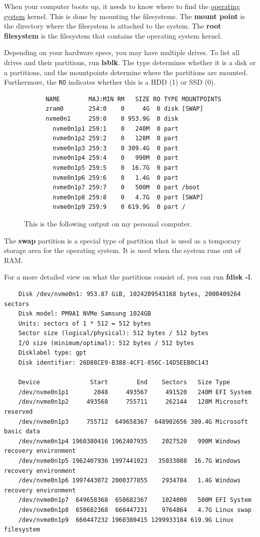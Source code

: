 \documentclass{article}
\begin{document}
  When your computer boots up, it needs to know where to find the \hyperref[def:operating-system]{operating system} kernel. This is done by mounting the filesystems. The \textbf{mount point} is the directory where the filesystem is attached to the system. The \textbf{root filesystem} is the filesystem that contains the operating system kernel.

  Depending on your hardware specs, you may have multiple drives. To list all drives and their partitions, run \textbf{lsblk}. The type determines whether it is a disk or a partitions, and the mountpoints determine where the partitions are mounted. Furthermore, the \texttt{RO} indicates whether this is a HDD (1) or SSD (0). 

  \begin{figure}[hbt!]
    \centering 
    \begin{lstlisting} 
      NAME        MAJ:MIN RM   SIZE RO TYPE MOUNTPOINTS
      zram0       254:0    0     4G  0 disk [SWAP]
      nvme0n1     259:0    0 953.9G  0 disk 
        nvme0n1p1 259:1    0   240M  0 part 
        nvme0n1p2 259:2    0   128M  0 part 
        nvme0n1p3 259:3    0 309.4G  0 part 
        nvme0n1p4 259:4    0   990M  0 part 
        nvme0n1p5 259:5    0  16.7G  0 part 
        nvme0n1p6 259:6    0   1.4G  0 part 
        nvme0n1p7 259:7    0   500M  0 part /boot
        nvme0n1p8 259:8    0   4.7G  0 part [SWAP]
        nvme0n1p9 259:9    0 619.9G  0 part /
    \end{lstlisting}
    \caption{This is the following output on my personal computer. } 
    \label{fig:lsblk}
  \end{figure}
    
  The \textbf{swap} partition is a special type of partition that is used as a temporary storage area for the operating system. It is used when the system runs out of RAM. 

  For a more detailed view on what the partitions consist of, you can run \textbf{fdisk -l}.
  \begin{lstlisting} 
    Disk /dev/nvme0n1: 953.87 GiB, 1024209543168 bytes, 2000409264 sectors
    Disk model: PM9A1 NVMe Samsung 1024GB               
    Units: sectors of 1 * 512 = 512 bytes
    Sector size (logical/physical): 512 bytes / 512 bytes
    I/O size (minimum/optimal): 512 bytes / 512 bytes
    Disklabel type: gpt
    Disk identifier: 26D88CE9-B388-4CF1-856C-14D5EEB0C143

    Device              Start        End    Sectors   Size Type
    /dev/nvme0n1p1       2048     493567     491520   240M EFI System
    /dev/nvme0n1p2     493568     755711     262144   128M Microsoft reserved
    /dev/nvme0n1p3     755712  649658367  648902656 309.4G Microsoft basic data
    /dev/nvme0n1p4 1960380416 1962407935    2027520   990M Windows recovery environment
    /dev/nvme0n1p5 1962407936 1997441023   35033088  16.7G Windows recovery environment
    /dev/nvme0n1p6 1997443072 2000377855    2934784   1.4G Windows recovery environment
    /dev/nvme0n1p7  649658368  650682367    1024000   500M EFI System
    /dev/nvme0n1p8  650682368  660447231    9764864   4.7G Linux swap
    /dev/nvme0n1p9  660447232 1960380415 1299933184 619.9G Linux filesystem
  \end{lstlisting}
\end{document}
